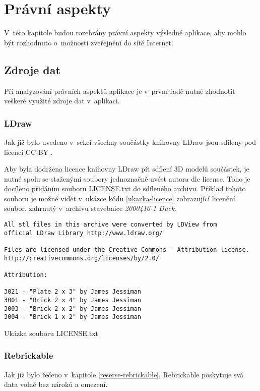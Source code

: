 \chapter{Právní aspekty} 
V~této kapitole budou rozebrány právní aspekty výsledné aplikace, aby mohlo být rozhodnuto o~možnosti zveřejnění do sítě Internet. 

\section{Zdroje dat}
Při analyzování právních aspektů aplikace je v~první řadě nutné zhodnotit veškeré využité zdroje dat v~aplikaci. 

\subsection{LDraw}
Jak již bylo uvedeno v~sekci \autocite{reserse-ldraw} všechny součástky knihovny LDraw jsou sdíleny pod licencí \gls{CC-BY} \autocite{CC-BY}.

Aby byla dodržena licence knihovny LDraw při sdílení 3D modelů součástek, je nutné spolu se staženými soubory jednoznačně uvést autora dle licence. Toho je docíleno přidáním souboru LICENSE.txt do sdíleného archivu. Příklad tohoto souboru je možné vidět v~ukázce kódu \ref{ukazka-licence} zobrazující licenční soubor, zahrnutý v~archivu stavebnice \textit{2000416-1 Duck}.

\begin{listing}[htbp]
        \begin{verbatim}
All stl files in this archive were converted by LDView from 
official LDraw Library http://www.ldraw.org/

Files are licensed under the Creative Commons - Attribution license.
http://creativecommons.org/licenses/by/2.0/

Attribution:

3021 - "Plate 2 x 3" by James Jessiman
3001 - "Brick 2 x 4" by James Jessiman
3003 - "Brick 2 x 2" by James Jessiman
3004 - "Brick 1 x 2" by James Jessiman
        \end{verbatim}
    \caption{Ukázka souboru LICENSE.txt\label{ukazka-licence}}
\end{listing}

\subsection{Rebrickable}
Jak již bylo řečeno v~kapitole \ref{reserse-rebrickable}, Rebrickable poskytuje svá data volně bez nároků a omezení.

